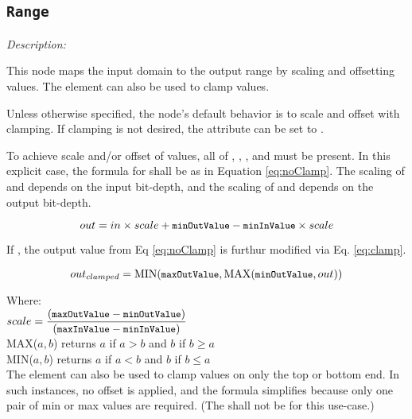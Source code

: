 \subsection{\texttt{Range}}

\emph{Description:} \par
This node maps the input domain to the output range by scaling and offsetting values. The  element can also be used to clamp values.

Unless otherwise specified, the node's default behavior is to scale and offset with clamping. If clamping is not desired, the  attribute can be set to .

To achieve scale and/or offset of values, all of , , , and  must be present. In this explicit case, the formula for  shall be as in Equation \ref{eq:noClamp}. The scaling of  and  depends on the input bit-depth, and the scaling of  and  depends on the output bit-depth.

\begin{equation}\label{eq:noClamp}
	out = in \times scale + {\small \texttt{minOutValue}} - {\small \texttt{minInValue}} \times scale
\end{equation}

If , the output value from Eq \ref{eq:noClamp} is furthur modified via Eq. \ref{eq:clamp}.

\begin{equation}\label{eq:clamp}
	out_{clamped} = \mathrm{MIN}({\small \texttt{maxOutValue}}, \mathrm{MAX}( {\small \texttt{minOutValue}}, out))
\end{equation}

\tabto{0.25in} Where: \\[6pt]
\tabto{0.5in} $scale = \dfrac{({\small \texttt{maxOutValue}} - {\small \texttt{minOutValue}})}{({\small \texttt{maxInValue}} - {\small \texttt{minInValue}})}$ \\[12pt]
\tabto{0.5in} MAX(${a,b}$) returns $a$ if $a > b$ and $b$ if $b \geq a$ \\[6pt]
\tabto{0.5in} MIN(${a,b}$) returns $a$ if $a < b$ and $b$ if $b \leq a$ \\[10pt]

The  element can also be used to clamp values on only the top or bottom end. In such instances, no offset is applied, and the formula simplifies because only one pair of min or max values are required. (The  shall not be  for this use-case.)


